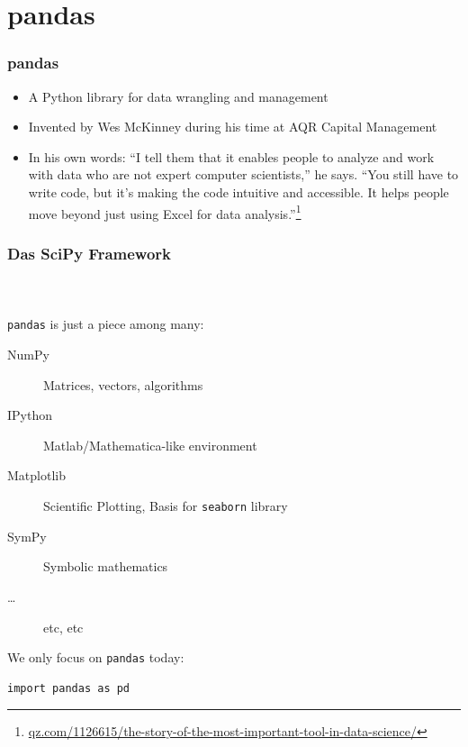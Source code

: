 \documentclass[ngerman]{beamer}
\begin{document}
\section{pandas}

\begin{frame}
\frametitle{pandas}

\begin{itemize}
	\item A Python library for data wrangling and management
	\item Invented by Wes McKinney during his time at AQR Capital Management
	\item In his own words:
\enquote{I tell them that it enables people to analyze and work with data who are not expert computer scientists,} he says. \enquote{You still have to write code, but it’s making the code intuitive and accessible. It helps people move beyond just using Excel for data analysis.}\footnote{\url{qz.com/1126615/the-story-of-the-most-important-tool-in-data-science/}}
\end{itemize}

\end{frame}



\begin{frame}[containsverbatim]
\frametitle{Das SciPy Framework}
\framesubtitle{~}

\texttt{pandas} is just a piece among many:\vspace*{1em}

\begin{description}
\item[NumPy] Matrices, vectors, algorithms
\item[IPython] Matlab/Mathematica-like environment
\item[Matplotlib] Scientific Plotting, Basis for \texttt{seaborn} library
\item[SymPy] Symbolic mathematics
\item [\ldots] etc, etc
\end{description}\vspace*{0.5em}

We only focus on \texttt{pandas} today:

\begin{lstlisting}
import pandas as pd
\end{lstlisting}

\end{frame}
\end{document}
